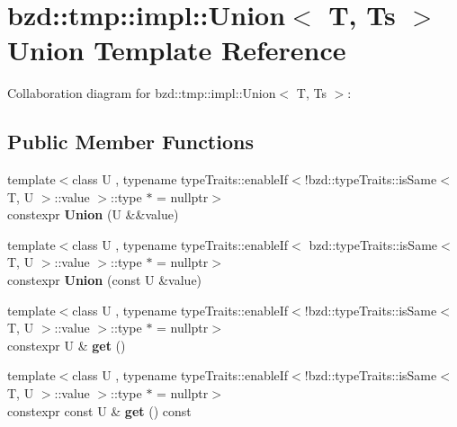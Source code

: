 \hypertarget{unionbzd_1_1tmp_1_1impl_1_1Union}{}\section{bzd\+:\+:tmp\+:\+:impl\+:\+:Union$<$ T, Ts $>$ Union Template Reference}
\label{unionbzd_1_1tmp_1_1impl_1_1Union}


Collaboration diagram for bzd\+:\+:tmp\+:\+:impl\+:\+:Union$<$ T, Ts $>$\+:
\subsection*{Public Member Functions}
\begin{DoxyCompactItemize}
\item 
\mbox{\label{unionbzd_1_1tmp_1_1impl_1_1Union_a2ee8c0b71a9b700db65c689878dad56e}} 
{\footnotesize template$<$class U , typename type\+Traits\+::enable\+If$<$!bzd\+::type\+Traits\+::is\+Same$<$ T, U $>$\+::value $>$\+::type $\ast$  = nullptr$>$ }\\constexpr {\bfseries Union} (U \&\&value)
\item 
\mbox{\label{unionbzd_1_1tmp_1_1impl_1_1Union_a2d69300bd33d0f491e5ee30d0891c571}} 
{\footnotesize template$<$class U , typename type\+Traits\+::enable\+If$<$ bzd\+::type\+Traits\+::is\+Same$<$ T, U $>$\+::value $>$\+::type $\ast$  = nullptr$>$ }\\constexpr {\bfseries Union} (const U \&value)
\item 
\mbox{\label{unionbzd_1_1tmp_1_1impl_1_1Union_ac5126c79c6c06a28864d2c7d8bf111d8}} 
{\footnotesize template$<$class U , typename type\+Traits\+::enable\+If$<$!bzd\+::type\+Traits\+::is\+Same$<$ T, U $>$\+::value $>$\+::type $\ast$  = nullptr$>$ }\\constexpr U \& {\bfseries get} ()
\item 
\mbox{\label{unionbzd_1_1tmp_1_1impl_1_1Union_aef02b0d662b724f6a500c83b2683b33a}} 
{\footnotesize template$<$class U , typename type\+Traits\+::enable\+If$<$!bzd\+::type\+Traits\+::is\+Same$<$ T, U $>$\+::value $>$\+::type $\ast$  = nullptr$>$ }\\constexpr const U \& {\bfseries get} () const

\end{DoxyCompactItemize}
